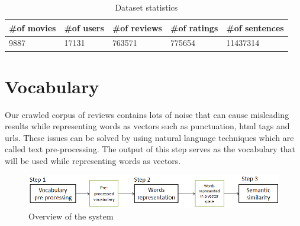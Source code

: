 \documentclass{article}
\begin{document}
\begin{table}[]
\centering
\caption{Dataset statistics}
\label{datastat}
\begin{tabular}{|l|l|l|l|l|}
\hline
\#of movies & \#of users & \#of reviews & \#of ratings & \#of sentences \\ \hline
9887        & 17131      & 763571       & 775654       & 11437314       \\ \hline
\end{tabular}
\end{table}


\section{Vocabulary}
\label{vocab}
Our crawled corpus of reviews contains lots of noise that can cause misleading results while representing words as vectors such as punctuation, html tags and urls. These issues can be solved by using natural language techniques which are called text pre-processing. The output of this step serves as the vocabulary that will be used while representing words as vectors.
\begin{figure}
 \begin{center}
 \includegraphics[scale=0.6]{introChapter1} 
 \caption{ Overview of the system} 
  \label{introChapter1}
  \end{center}
 \end{figure}
 
\end{document}
